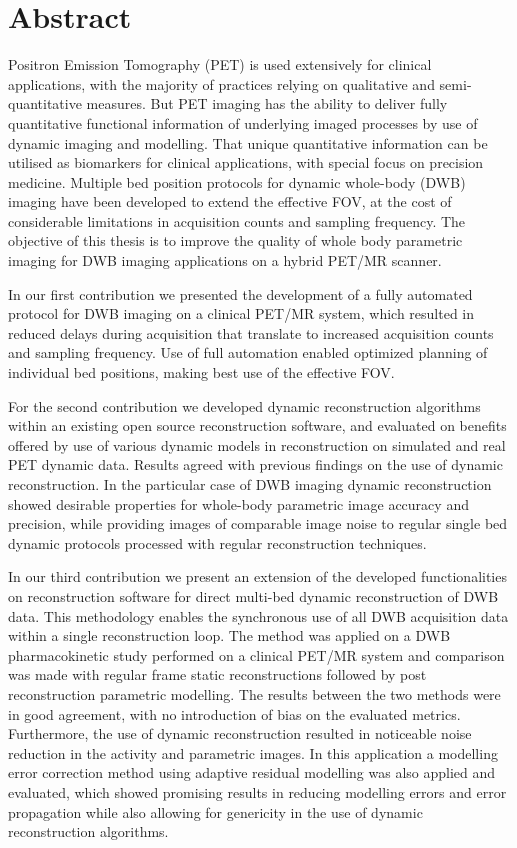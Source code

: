 \section*{Abstract}
Positron Emission Tomography (PET) is used extensively for clinical applications, with the majority of practices relying on qualitative and semi-quantitative measures. But PET imaging has the ability to deliver fully quantitative functional information of underlying imaged processes by use of dynamic imaging and modelling. That unique quantitative information can be utilised as biomarkers for clinical applications, with special focus on precision medicine. Multiple bed position protocols for dynamic whole-body (DWB) imaging have been developed to extend the effective FOV, at the cost of considerable limitations in acquisition counts and sampling frequency. The objective of this thesis is to improve the quality of whole body parametric imaging for DWB imaging applications on a hybrid PET/MR scanner.

In our first contribution we presented the development of a fully automated protocol for DWB imaging on a clinical PET/MR system, which resulted in reduced delays during acquisition that translate to increased acquisition counts and sampling frequency. Use of full automation enabled optimized planning of individual bed positions, making best use of the effective FOV. 

For the second contribution we developed dynamic reconstruction algorithms within an existing open source reconstruction software, and evaluated on benefits offered by use of various dynamic models in reconstruction on simulated and real PET dynamic data. 
Results agreed with previous findings on the use of dynamic reconstruction. In the particular case of DWB imaging dynamic reconstruction showed desirable properties for whole-body parametric image accuracy and precision, while providing images of comparable image noise to regular single bed dynamic protocols processed with regular reconstruction techniques.

In our third contribution we present an extension of the developed functionalities on reconstruction software for direct multi-bed dynamic reconstruction of DWB data. This methodology enables the synchronous use of all DWB acquisition data within a single reconstruction loop. The method was applied on a DWB pharmacokinetic study performed on a clinical PET/MR system and comparison was made with regular frame static reconstructions followed by post reconstruction parametric modelling. The results between the two methods were in good agreement, with no introduction of bias on the evaluated metrics. Furthermore, the use of dynamic reconstruction resulted in noticeable noise reduction in the activity and parametric images. In this application a modelling error correction method using adaptive residual modelling was also applied and evaluated, which showed promising results in reducing modelling errors and error propagation while also allowing for genericity in the use of dynamic reconstruction algorithms.

